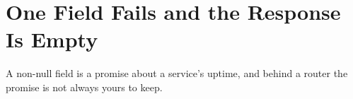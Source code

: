 \chapter{One Field Fails and the Response Is Empty}
\label{ch:null-blast-radius}

A non-null field is a promise about a service's uptime, and behind a router
the promise is not always yours to keep.










